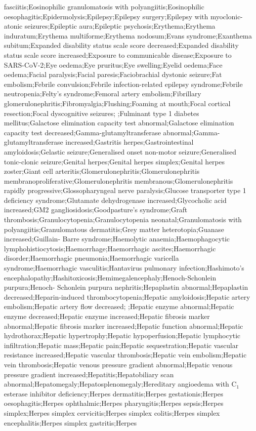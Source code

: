 \begin{refsection}
\begin{tcolorbox}[quote]
fasciitis;Eosinophilic granulomatosis with polyangiitis;Eosinophilic oesophagitis;Epidermolysis;Epilepsy;Epilepsy surgery;Epilepsy with myoclonic-atonic seizures;Epileptic aura;Epileptic psychosis;Erythema;Erythema induratum;Erythema multiforme;Erythema nodosum;Evans syndrome;Exanthema subitum;Expanded disability status scale score decreased;Expanded disability status scale score increased;Exposure to communicable disease;Exposure to SARS-CoV-2;Eye oedema;Eye pruritus;Eye swelling;Eyelid oedema;Face oedema;Facial paralysis;Facial paresis;Faciobrachial dystonic seizure;Fat embolism;Febrile convulsion;Febrile infection-related epilepsy syndrome;Febrile neutropenia;Felty's syndrome;Femoral artery embolism;Fibrillary glomerulonephritis;Fibromyalgia;Flushing;Foaming at mouth;Focal cortical resection;Focal dyscognitive seizures; ;Fulminant type 1 diabetes mellitus;Galactose elimination capacity test abnormal;Galactose elimination capacity test decreased;Gamma-glutamyltransferase abnormal;Gamma-glutamyltransferase increased;Gastritis herpes;Gastrointestinal amyloidosis;Gelastic seizure;Generalised onset non-motor seizure;Generalised tonic-clonic seizure;Genital herpes;Genital herpes simplex;Genital herpes zoster;Giant cell arteritis;Glomerulonephritis;Glomerulonephritis membranoproliferative;Glomerulonephritis membranous;Glomerulonephritis rapidly progressive;Glossopharyngeal nerve paralysis;Glucose transporter type 1 deficiency syndrome;Glutamate dehydrogenase increased;Glycocholic acid increased;GM2 gangliosidosis;Goodpasture's syndrome;Graft thrombosis;Granulocytopenia;Granulocytopenia neonatal;Granulomatosis with polyangiitis;Granulomatous dermatitis;Grey matter heterotopia;Guanase increased;Guillain- Barre syndrome;Haemolytic anaemia;Haemophagocytic lymphohistiocytosis;Haemorrhage;Haemorrhagic ascites;Haemorrhagic disorder;Haemorrhagic pneumonia;Haemorrhagic varicella syndrome;Haemorrhagic vasculitis;Hantavirus pulmonary infection;Hashimoto's encephalopathy;Hashitoxicosis;Hemimegalencephaly;Henoch-Schonlein purpura;Henoch- Schonlein purpura nephritis;Hepaplastin abnormal;Hepaplastin decreased;Heparin-induced thrombocytopenia;Hepatic amyloidosis;Hepatic artery embolism;Hepatic artery flow decreased; ;Hepatic enzyme abnormal;Hepatic enzyme decreased;Hepatic enzyme increased;Hepatic fibrosis marker abnormal;Hepatic fibrosis marker increased;Hepatic function abnormal;Hepatic hydrothorax;Hepatic hypertrophy;Hepatic hypoperfusion;Hepatic lymphocytic infiltration;Hepatic mass;Hepatic pain;Hepatic sequestration;Hepatic vascular resistance increased;Hepatic vascular thrombosis;Hepatic vein embolism;Hepatic vein thrombosis;Hepatic venous pressure gradient abnormal;Hepatic venous pressure gradient increased;Hepatitis;Hepatobiliary scan abnormal;Hepatomegaly;Hepatosplenomegaly;Hereditary angioedema with C$_{1}$ esterase inhibitor deficiency;Herpes dermatitis;Herpes gestationis;Herpes oesophagitis;Herpes ophthalmic;Herpes pharyngitis;Herpes sepsis;Herpes simplex;Herpes simplex cervicitis;Herpes simplex colitis;Herpes simplex encephalitis;Herpes simplex gastritis;Herpes 
\end{tcolorbox}
\end{refsection}
